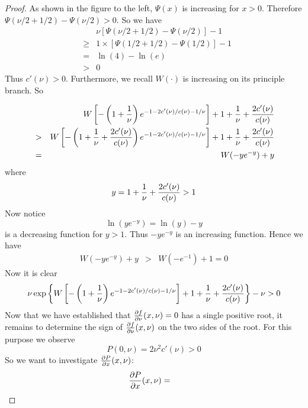 \documentclass{article}
\begin{document}
\begin{proof}
\begin{minipage}{0.48\textwidth}
  \end{minipage}\hfill
  \begin{minipage}{0.5\textwidth}
    As shown in the figure to the left, $\Psi(x)$ is increasing
    for $x > 0$. Therefore $\Psi(\nu/2 + 1/2) - \Psi(\nu/2) > 0$.
    So we have
    \begin{eqnarray*}
      && \nu \left[
        \Psi(\nu/2 + 1/2) - \Psi(\nu/2)
      \right] - 1 \\
      &\geq& 1 \times \left[
        \Psi(1/2 + 1/2) - \Psi(1/2)
      \right] - 1 \\
      &=& \ln(4) - \ln(e) \\
      &>& 0
    \end{eqnarray*}
    Thus $c'(\nu) > 0$. Furthermore, we recall
    $W(\cdot)$ is increasing on its principle branch. So
  \end{minipage}
  \begin{eqnarray*}
    &&
    W\left[
      -\left( 1 + {1 \over \nu} \right)
      e^{-1 - 2 c'(\nu)/c(\nu) - 1/\nu}
    \right]
    + 1 + {1 \over \nu} + {2 c'(\nu) \over c(\nu)} \\
    &>& 
    W\left[
      -\left( 1 + {1 \over \nu} + {2 c'(\nu) \over c(\nu)} \right)
      e^{-1 - 2 c'(\nu)/c(\nu) - 1/\nu}
    \right]
    + 1 + {1 \over \nu} + {2 c'(\nu) \over c(\nu)} \\
    &=& W(-y e^{-y}) + y
  \end{eqnarray*}
  where
  \[
  y = 1 + {1 \over \nu} + {2 c'(\nu) \over c(\nu)} > 1
  \]
  Now notice
  \[
  \ln(y e^{-y}) = \ln(y) - y
  \]
  is a decreasing function for $y > 1$. Thus $-y e^{-y}$ is an
  increasing function. Hence we have
  \begin{eqnarray*}
    W(-y e^{-y}) + y &>& W(-e^{-1}) + 1 = 0
  \end{eqnarray*}
  Now it is clear
  \[
  \nu\exp\left\{
    W\left[
      -\left(1 + {1 \over \nu}\right)
      e^{-1 - 2 c'(\nu)/c(\nu) - 1/\nu}
    \right]
    + 1 + {1 \over \nu} + {2 c'(\nu) \over c(\nu)}
  \right\} - \nu > 0
  \]
  Now that we have established that $\frac{\partial f}{\partial \nu}(x, \nu) = 0$ has a
  single positive root, it remains to determine the sign of
  $\frac{\partial f}{\partial \nu}(x, \nu)$ on the two sides of the root. For this purpose
  we observe
  \begin{equation}
    \label{eq:xxie5.1}
    P(0, \nu) = 2 \nu^2 c'(\nu) > 0
  \end{equation}
  So we want to investigate $\frac{\partial P}{\partial x}(x, \nu)$:
  \begin{eqnarray}
    \pd{P}{x}(x, \nu) &=&

\end{eqnarray}
\end{proof}
\end{document}
